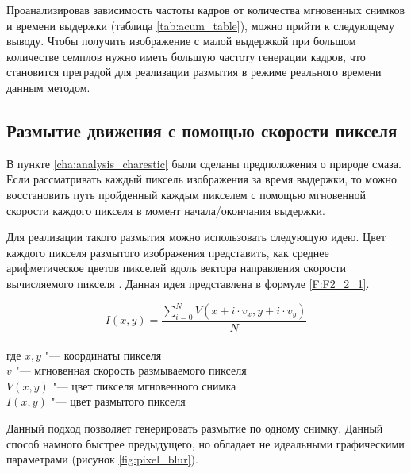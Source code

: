 Проанализировав зависимость частоты кадров от количества мгновенных снимков и времени выдержки (таблица \ref{tab:acum_table}), можно прийти к следующему выводу. Чтобы получить изображение с малой выдержкой при большом количестве семплов нужно иметь большую частоту генерации кадров, что становится преградой для реализации размытия в режиме реального времени данным методом.

\subsection{Размытие движения с помощью скорости пикселя}
\label{cha:analysis_pixelblur}


В пункте \ref{cha:analysis_charestic} были сделаны предположения о природе смаза. Если рассматривать каждый пиксель изображения за время выдержки, то можно восстановить путь пройденный каждым пикселем с помощью мгновенной скорости каждого пикселя в момент начала/окончания выдержки.


\par
Для реализации такого размытия можно использовать следующую идею. Цвет каждого пикселя размытого изображения представить, как среднее арифметическое цветов пикселей вдоль вектора направления скорости вычисляемого пикселя   \cite{GpuGems2008}. Данная идея представлена в формуле \eqref{F:F2_2_1}. 

\begin{eqndesc}
    \begin{equation}\label{F:F2_2_1}
        I(x,y) = \frac{\sum_{i=0}^{N} {V(x + i \cdot v_x, y + i \cdot v_y)}}{N}
    \end{equation}
    \\
    где $x,y$ "--- координаты пикселя \\
    $v$ "--- мгновенная скорость размываемого пикселя  \\
    $V(x,y)$ "--- цвет пикселя мгновенного снимка \\
    $I(x,y)$ "--- цвет размытого пикселя
\end{eqndesc}



Данный подход позволяет генерировать размытие по одному снимку. Данный способ намного быстрее предыдущего, но обладает не идеальными графическими параметрами (рисунок \ref{fig:pixel_blur}).


